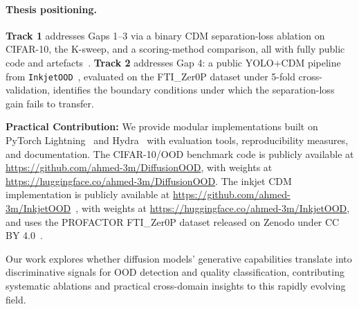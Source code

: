 \paragraph{Thesis positioning.}
\textbf{Track 1} addresses Gaps 1--3 via a binary CDM separation-loss ablation on CIFAR-10, the K-sweep, and a scoring-method comparison, all with fully public code and artefacts~\cite{DiffusionOOD}. \textbf{Track 2} addresses Gap 4: a public YOLO+CDM pipeline from \texttt{InkjetOOD}~\cite{mohammed2026inkjetood}, evaluated on the FTI\_Zer0P dataset under 5-fold cross-validation, identifies the boundary conditions under which the separation-loss gain fails to transfer.

\textbf{Practical Contribution:} We provide modular implementations built on PyTorch Lightning~\cite{falcon2019pytorch} and Hydra~\cite{yadan2019hydra} with evaluation tools, reproducibility measures, and documentation. The CIFAR-10/OOD benchmark code is publicly available at \url{https://github.com/ahmed-3m/DiffusionOOD}, with weights at \url{https://huggingface.co/ahmed-3m/DiffusionOOD}. The inkjet CDM implementation is publicly available at \url{https://github.com/ahmed-3m/InkjetOOD}~\cite{mohammed2026inkjetood}, with weights at \url{https://huggingface.co/ahmed-3m/InkjetOOD}, and uses the PROFACTOR FTI\_Zer0P dataset released on Zenodo under CC BY 4.0~\citep{profactor2024fti}.

Our work explores whether diffusion models' generative capabilities translate into discriminative signals for OOD detection and quality classification, contributing systematic ablations and practical cross-domain insights to this rapidly evolving field.
\endgroup
